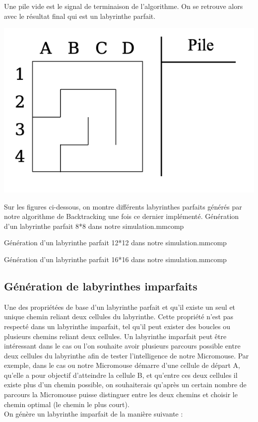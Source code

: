 \begin{minipage}{0.6\textwidth}
Une pile vide est le signal de terminaison de l'algorithme. On se retrouve alors avec le résultat final qui est un labyrinthe parfait.
\\

\end{minipage}
\begin{minipage}{0.42\textwidth}
\includegraphics[width=\linewidth]{pics/backtracking8.png}
\end{minipage}

Sur les figures ci-dessous, on montre différents labyrinthes parfaits générés par notre algorithme de Backtracking une fois ce dernier implémenté.
{Génération d'un labyrinthe parfait 8*8 dans notre simulation.}{mmcomp}
\newpage

{Génération d'un labyrinthe parfait 12*12 dans notre simulation.}{mmcomp}

{Génération d'un labyrinthe parfait 16*16 dans notre simulation.}{mmcomp}

\subsection{Génération de labyrinthes imparfaits}
Une des propriétées de base d'un labyrinthe parfait et qu'il existe un seul et unique chemin reliant deux cellules du labyrinthe. Cette propriété n'est pas respecté dans un labyrinthe imparfait, tel qu'il peut exister des boucles ou plusieurs chemins reliant deux cellules. Un labyrinthe imparfait peut être intéressant dans le cas ou l'on souhaite avoir plusieurs parcours possible entre deux cellules du labyrinthe afin de tester l'intelligence de notre Micromouse. Par exemple, dans le cas ou notre Micromouse démarre d'une cellule de départ A, qu'elle a pour objectif d'atteindre la cellule B, et qu'entre ces deux cellules il existe plus d'un chemin possible, on souhaiterais qu'après un certain nombre de parcours la Micromouse puisse distinguer entre les deux chemins et choisir le chemin optimal (le chemin le plus court).
\\
\newline
On génère un labyrinthe imparfait de la manière suivante :

